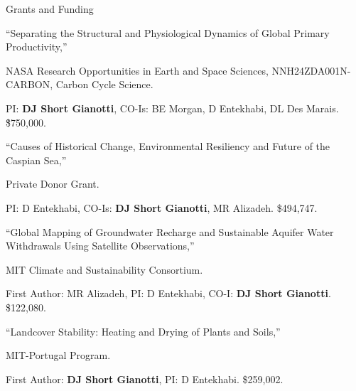 \begin{rubric}{Grants and Funding}
%
    \begin{hangparas}{1em}{1}
        \par ``Separating the Structural and Physiological Dynamics of Global Primary Productivity,'' 
        \par NASA Research Opportunities in Earth and Space Sciences, 
        NNH24ZDA001N-CARBON, Carbon Cycle Science. 
        \par PI: \textbf{DJ Short Gianotti}, CO-Is: BE Morgan, D Entekhabi, DL Des Marais. \~\$750,000.
    \end{hangparas}
% 
    \begin{hangparas}{1em}{1}
        \par ``Causes of Historical Change, Environmental Resiliency and Future of the Caspian Sea,'' 
        \par Private Donor Grant. 
        \par PI: D Entekhabi, CO-Is: \textbf{DJ Short Gianotti}, MR Alizadeh. \$494,747.
    \end{hangparas}
%
    \begin{hangparas}{1em}{1}
        \par ``Global Mapping of Groundwater Recharge and Sustainable Aquifer Water Withdrawals Using Satellite Observations,'' 
        \par MIT Climate and Sustainability Consortium. 
        \par First Author: MR Alizadeh, PI: D Entekhabi, CO-I: \textbf{DJ Short Gianotti}. \$122,080.
    \end{hangparas}
%
    \begin{hangparas}{1em}{1} 
        \par ``Landcover Stability: Heating and Drying of Plants and Soils,'' 
        \par MIT-Portugal Program. 
        \par First Author: \textbf{DJ Short Gianotti}, PI: D Entekhabi. \$259,002.

\end{hangparas}
\end{rubric}
